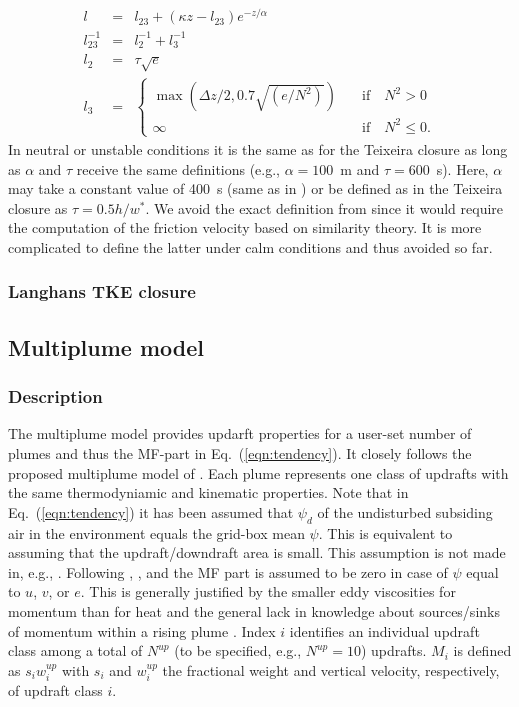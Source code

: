 \documentclass[dvipdfmx,a4paper,10pt]{article}
\begin{document}
\begin{eqnarray}
 l &=&l_{23} + (\kappa z - l_{23}) e^{-z/\alpha} \\
 l_{23}^{-1}&=&l_{2}^{-1} + l_{3}^{-1}\\
 l_{2} &=& \tau \sqrt{e}\\
 l_{3} &=& \left\{ 
 \begin{array}{ll}
  \max(\Delta z/2, 0.7 \sqrt{(e/N^2)})&\quad \mathrm{if}\quad N^2>0\\
  \infty &\quad \mathrm{if}\quad N^2\leq 0.
  \end{array}\right.
\end{eqnarray}
In neutral or unstable conditions it is the same as for the Teixeira closure as long as $\alpha$ and $\tau$ receive the same definitions (e.g., $\alpha=100$~m and $\tau=600$~s). Here, $\alpha$ may take a constant value of 400~s (same as in \cite{suselj13}) or be defined as in the Teixeira closure as $\tau=0.5 h/w^*$. We avoid the exact definition from \cite{witek11} since it would require the computation of the friction velocity based on similarity theory. It is more complicated to define the latter under calm conditions and thus avoided so far.

\subsubsection{Langhans TKE closure}

\subsection{Multiplume model}

\subsubsection{Description}

The multiplume model provides updarft properties for a user-set number of plumes and thus the MF-part in Eq.~(\ref{eqn:tendency}). It closely follows the proposed multiplume model of \cite{cheinet03a}. Each plume represents one class of updrafts with the same thermodyniamic and kinematic properties. Note that in Eq.~(\ref{eqn:tendency}) it has been assumed that $\psi_d$ of the undisturbed subsiding air in the environment equals the grid-box mean $\psi$. This is equivalent to assuming that the updraft/downdraft area is small. This assumption is not made in, e.g., \cite{cheinet03a}. Following \cite{suselj12}, \cite{suselj13}, and \cite{suselj14} the MF part is assumed to be zero in case of $\psi$ equal to $u$, $v$, or $e$. This is generally justified by the smaller eddy viscosities for momentum than for heat and the general lack in knowledge about sources/sinks of momentum within a rising plume \citep[see, e.g., discussion in][]{han15}. Index $i$ identifies an individual updraft class among a total of $N^{up}$ (to be specified, e.g., $N^{up}=10$) updrafts. $M_i$ is defined as $s_i w^{up}_i$ with $s_i$ and $w^{up}_i$ the fractional weight and vertical velocity, respectively, of updraft class $i$. 
\end{document}
